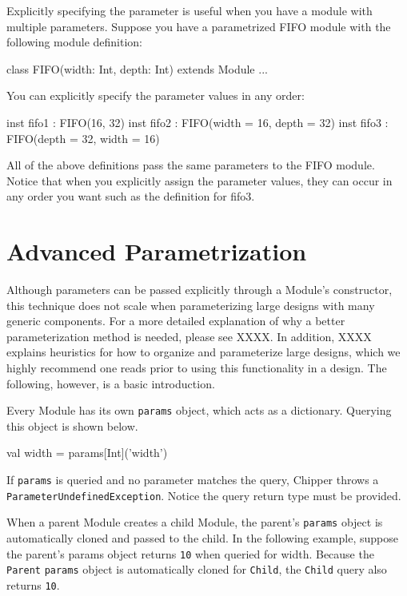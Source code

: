 Explicitly specifying the parameter is useful when you have a module with multiple parameters. Suppose you have a parametrized FIFO module with the following module definition:

\begin{stanza}
class FIFO(width: Int, depth: Int) extends Module {...}
\end{stanza}

You can explicitly specify the parameter values in any order:

\begin{stanza}
inst fifo1 : FIFO(16, 32)
inst fifo2 : FIFO(width = 16, depth = 32)
inst fifo3 : FIFO(depth = 32, width = 16)
\end{stanza}

All of the above definitions pass the same parameters to the FIFO module. Notice that when you explicitly assign the parameter values, they can occur in any order you want such as the definition for fifo3.

\section{Advanced Parametrization}

Although parameters can be passed explicitly through a Module's constructor, this technique does not scale when parameterizing large designs with many generic components. For a more detailed explanation of why a better parameterization method is needed, please see XXXX. In addition, XXXX explains heuristics for how to organize and parameterize large designs, which we highly recommend one reads prior to using this functionality in a design. The following, however, is a basic introduction.

Every Module has its own \verb+params+ object, which acts as a dictionary. Querying this object is shown below.

\begin{stanza}
val width = params[Int]('width')
\end{stanza}

If \verb+params+ is queried and no parameter matches the query, Chipper throws a \verb+ParameterUndefinedException+. Notice the query return type must be provided.

When a parent Module creates a child Module, the parent's \verb+params+ object is automatically cloned and passed to the child. In the following example, suppose the parent's params object returns \verb+10+ when queried for width. Because the \verb+Parent+ \verb+params+ object is automatically cloned for \verb+Child+, the \verb+Child+ query also returns \verb+10+.

